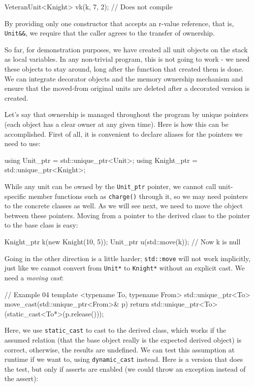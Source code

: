 \begin{code}
VeteranUnit<Knight> vk(k, 7, 2); // Does not compile
\end{code}

By providing only one constructor that accepts an r-value reference, that is, \texttt{Unit\&\&}, we require that the caller agrees to the transfer of ownership.

So far, for demonstration purposes, we have created all unit objects on the stack as local variables. In any non-trivial program, this is not going to work - we need these objects to stay around, long after the function that created them is done. We can integrate decorator objects and the memory ownership mechanism and ensure that the moved-from original units are deleted after a decorated version is created.

Let's say that ownership is managed throughout the program by unique pointers (each object has a clear owner at any given time). Here is how this can be accomplished. First of all, it is convenient to declare aliases for the pointers we need to use:

\begin{code}
using Unit_ptr = std::unique_ptr<Unit>;
using Knight_ptr = std::unique_ptr<Knight>;
\end{code}

While any unit can be owned by the \texttt{Unit\_ptr} pointer, we cannot call unit-specific member functions such as \texttt{charge()} through it, so we may need pointers to the concrete classes as well. As we will see next, we need to move the object between these pointers. Moving from a pointer to the derived class to the pointer to the base class is easy:

\begin{code}
Knight_ptr k(new Knight(10, 5));
Unit_ptr u(std::move(k)); // Now k is null
\end{code}

Going in the other direction is a little harder; \texttt{std::move} will not work implicitly, just like we cannot convert from \texttt{Unit*} to \texttt{Knight*} without an explicit cast. We need a \emph{moving cast}:

\begin{code}
// Example 04
template <typename To, typename From>
std::unique_ptr<To> move_cast(std::unique_ptr<From>& p) {
 return std::unique_ptr<To>(static_cast<To*>(p.release()));
}
\end{code}

Here, we use \texttt{static\_cast} to cast to the derived class, which works if the assumed relation (that the base object really is the expected derived object) is correct, otherwise, the results are undefined. We can test this assumption at runtime if we want to, using \texttt{dynamic\_cast} instead. Here is a version that does the test, but only if asserts are enabled (we could throw an exception instead of the assert):


